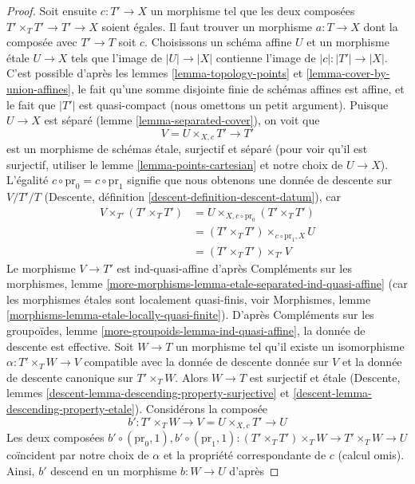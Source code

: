 \begin{proof}
\medskip\noindent
Soit ensuite $c : T' \to X$ un morphisme tel que les deux composées
$T' \times_T T' \to T' \to X$ soient égales. Il faut trouver un morphisme
$a : T \to X$ dont la composée avec $T' \to T$ soit $c$. Choisissons un
schéma affine $U$ et un morphisme \'etale $U \to X$ tels que l'image de
$|U| \to |X|$ contienne l'image de $|c| : |T'| \to |X|$.
C'est possible d'après les lemmes \ref{lemma-topology-points} et
\ref{lemma-cover-by-union-affines}, le fait qu'une somme disjointe finie de
schémas affines est affine, et le fait que $|T'|$ est quasi-compact
(nous omettons un petit argument). Puisque $U \to X$ est séparé
(lemme \ref{lemma-separated-cover}), on voit que
$$
V = U \times_{X, c} T' \longrightarrow T'
$$
est un morphisme de schémas \'etale, surjectif et séparé
(pour voir qu'il est surjectif, utiliser le lemme \ref{lemma-points-cartesian}
et notre choix de $U \to X$). L'égalité
$c \circ \text{pr}_0 = c \circ \text{pr}_1$ signifie que nous obtenons une
donnée de descente sur $V/T'/T$
(Descente, définition \ref{descent-definition-descent-datum}),
car
\begin{align*}
V \times_{T'} (T' \times_T T')
& =
U \times_{X, c \circ \text{pr}_0} (T' \times_T T') \\
& =
(T' \times_T T') \times_{c \circ \text{pr}_1, X} U \\
& =
(T' \times_T T') \times_{T'} V
\end{align*}
Le morphisme $V \to T'$ est ind-quasi-affine d'après
Compléments sur les morphismes, lemme
\ref{more-morphisms-lemma-etale-separated-ind-quasi-affine}
(car les morphismes \'etales sont localement quasi-finis, voir
Morphismes, lemme \ref{morphisms-lemma-etale-locally-quasi-finite}).
D'après Compléments sur les groupoïdes, lemme \ref{more-groupoids-lemma-ind-quasi-affine},
la donnée de descente est effective. Soit $W \to T$ un morphisme
tel qu'il existe un isomorphisme $\alpha : T' \times_T W \to V$
compatible avec la donnée de descente donnée sur $V$ et la donnée de descente
canonique sur $T' \times_T W$. Alors $W \to T$ est surjectif et \'etale
(Descente, lemmes \ref{descent-lemma-descending-property-surjective} et
\ref{descent-lemma-descending-property-etale}).
Considérons la composée
$$
b' : T' \times_T W \longrightarrow V = U \times_{X, c} T' \longrightarrow U
$$
Les deux composées
$b' \circ (\text{pr}_0, 1), 
b' \circ (\text{pr}_1, 1) :
(T' \times_T T') \times_T W \to T' \times_T W \to U$
coïncident par notre choix de $\alpha$ et la propriété correspondante de $c$
(calcul omis). Ainsi, $b'$ descend en un morphisme $b : W \to U$ d'après

\end{proof}

